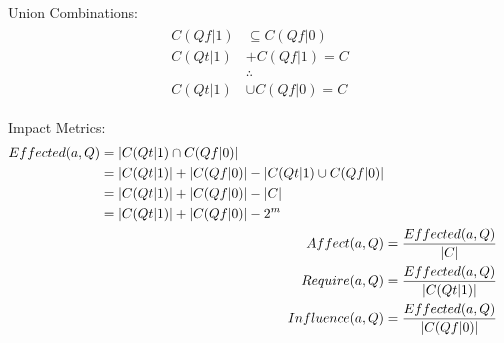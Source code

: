 \documentclass[10pt]{article}
\begin{document}
Union Combinations:
\begin{align}
\begin{split}
  C(Qf|1) &\subseteq C(Qf|0) \\
  C(Qt|1) &+ C(Qf|1) = C \\
             &\therefore \\
  C(Qt|1) &\cup C(Qf|0) = C
\end{split}
\end{align}


Impact Metrics:
\begin{align}
\begin{split}
  Effected(a,Q) &= \left\vert{ C(Qt|1) \cap C(Qf|0) }\right\vert \\
                &= \left\vert{ C(Qt|1) }\right\vert + \left\vert{ C(Qf|0) }\right\vert - \left\vert{ C(Qt|1) \cup C(Qf|0) }\right\vert \\
                &= \left\vert{ C(Qt|1) }\right\vert + \left\vert{ C(Qf|0) }\right\vert - \left\vert{C}\right\vert \\
                &= \left\vert{ C(Qt|1) }\right\vert + \left\vert{ C(Qf|0) }\right\vert - 2^m
\end{split} \\
  Affect(a,Q) &= \frac{Effected(a,Q)}{\left\vert{C}\right\vert} \\
  Require(a,Q) &= \frac{Effected(a,Q)}{\left\vert{ C(Qt|1) }\right\vert} \\
  Influence(a,Q) &= \frac{Effected(a,Q)}{\left\vert{ C(Qf|0) }\right\vert}
\end{align}
\end{document}
